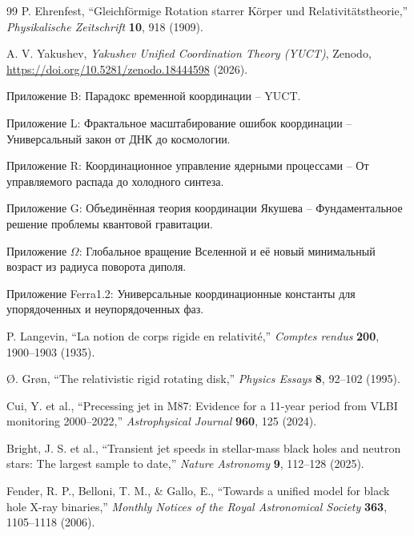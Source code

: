 \documentclass[12pt,a4paper]{article}
\begin{document}
	\begin{thebibliography}{99}
		P. Ehrenfest, ``Gleichf{\"o}rmige Rotation starrer K{\"o}rper und Relativit{\"a}tstheorie,'' \emph{Physikalische Zeitschrift} \textbf{10}, 918 (1909).
		
		A. V. Yakushev, \emph{Yakushev Unified Coordination Theory (YUCT)}, Zenodo, \url{https://doi.org/10.5281/zenodo.18444598} (2026).
		
		Приложение B: Парадокс временной координации -- YUCT.
		
		Приложение L: Фрактальное масштабирование ошибок координации -- Универсальный закон от ДНК до космологии.
		
		Приложение R: Координационное управление ядерными процессами -- От управляемого распада до холодного синтеза.
		
		Приложение G: Объединённая теория координации Якушева -- Фундаментальное решение проблемы квантовой гравитации.
		
		Приложение \(\Omega\): Глобальное вращение Вселенной и её новый минимальный возраст из радиуса поворота диполя.
		
		Приложение Ferra1.2: Универсальные координационные константы для упорядоченных и неупорядоченных фаз.
		
		P. Langevin, ``La notion de corps rigide en relativit{\'e},'' \emph{Comptes rendus} \textbf{200}, 1900--1903 (1935).
		
		{\O}. Gr{\o}n, ``The relativistic rigid rotating disk,'' \emph{Physics Essays} \textbf{8}, 92--102 (1995).
		
		Cui, Y. et al., ``Precessing jet in M87: Evidence for a 11-year period from VLBI monitoring 2000–2022,'' \emph{Astrophysical Journal} \textbf{960}, 125 (2024).
		
		Bright, J. S. et al., ``Transient jet speeds in stellar-mass black holes and neutron stars: The largest sample to date,'' \emph{Nature Astronomy} \textbf{9}, 112–128 (2025).
		
		Fender, R. P., Belloni, T. M., \& Gallo, E., ``Towards a unified model for black hole X-ray binaries,'' \emph{Monthly Notices of the Royal Astronomical Society} \textbf{363}, 1105–1118 (2006).
		

\end{thebibliography}
\end{document}
